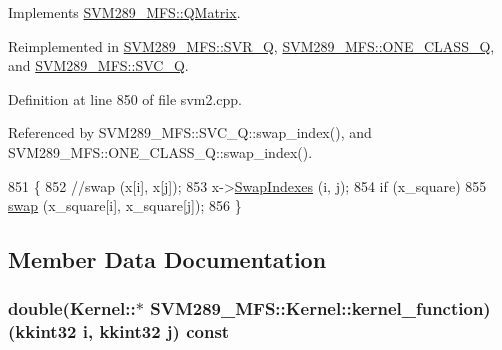 Implements \hyperlink{class_s_v_m289___m_f_s_1_1_q_matrix_a40288a65c5bf829f671a7722a36f101e}{S\+V\+M289\+\_\+\+M\+F\+S\+::\+Q\+Matrix}.



Reimplemented in \hyperlink{class_s_v_m289___m_f_s_1_1_s_v_r___q_abea243af58ef29037815efe1d1191402}{S\+V\+M289\+\_\+\+M\+F\+S\+::\+S\+V\+R\+\_\+Q}, \hyperlink{class_s_v_m289___m_f_s_1_1_o_n_e___c_l_a_s_s___q_a00459667791988a61c0e84cb06c4c6b3}{S\+V\+M289\+\_\+\+M\+F\+S\+::\+O\+N\+E\+\_\+\+C\+L\+A\+S\+S\+\_\+Q}, and \hyperlink{class_s_v_m289___m_f_s_1_1_s_v_c___q_a62219b7dbada662e0988f9e900ac5653}{S\+V\+M289\+\_\+\+M\+F\+S\+::\+S\+V\+C\+\_\+Q}.



Definition at line 850 of file svm2.\+cpp.



Referenced by S\+V\+M289\+\_\+\+M\+F\+S\+::\+S\+V\+C\+\_\+\+Q\+::swap\+\_\+index(), and S\+V\+M289\+\_\+\+M\+F\+S\+::\+O\+N\+E\+\_\+\+C\+L\+A\+S\+S\+\_\+\+Q\+::swap\+\_\+index().


\begin{DoxyCode}
851   \{
852     \textcolor{comment}{//swap (x[i], x[j]);}
853     x->\hyperlink{class_k_k_b_1_1_k_k_queue_a7a848286a5d2ddd9b0d320557a458f66}{SwapIndexes} (i, j);
854     \textcolor{keywordflow}{if}  (x\_square) 
855       \hyperlink{namespace_s_v_m289___m_f_s_a195322b74181af0322d4e086a529c096}{swap} (x\_square[i], x\_square[j]);
856   \}
\end{DoxyCode}


\subsection{Member Data Documentation}
\subsubsection[{\texorpdfstring{kernel\+\_\+function}{kernel_function}}]{\setlength{\rightskip}{0pt plus 5cm}double(Kernel\+::$\ast$ S\+V\+M289\+\_\+\+M\+F\+S\+::\+Kernel\+::kernel\+\_\+function) ({\bf kkint32} i, {\bf kkint32} j) const \hspace{0.3cm}{\ttfamily [protected]}}\hypertarget{class_s_v_m289___m_f_s_1_1_kernel_aeefe3098d1eb72604d8d9d82c385e7bd}{}\label{class_s_v_m289___m_f_s_1_1_kernel_aeefe3098d1eb72604d8d9d82c385e7bd}


